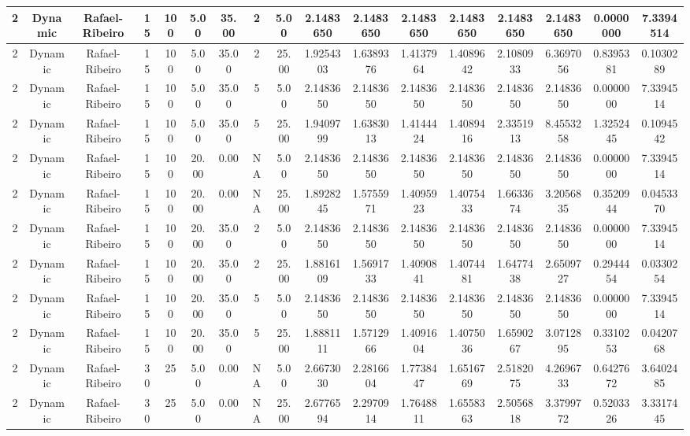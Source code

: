 \documentclass[a4paper]{article}
\begin{document}
\begin{center}
\begin{tabular}{ | c | c | c | c | c | c | c | c | c | c | c | c | c | c | c | c | c | }
		\hline
		2	&	Dynamic	&	Rafael-Ribeiro	&	15	&	100	&	5.00	&	35.00	&	2	&	5.00	&	2.1483650	&	2.1483650	&	2.1483650	&	2.1483650	&	2.1483650	&	2.1483650	&	0.0000000	&	7.3394514 \\
		\hline
		2	&	Dynamic	&	Rafael-Ribeiro	&	15	&	100	&	5.00	&	35.00	&	2	&	25.00	&	1.9254303	&	1.6389376	&	1.4137964	&	1.4089642	&	2.1080933	&	6.3697056	&	0.8395381	&	0.1030289 \\
		\hline
		2	&	Dynamic	&	Rafael-Ribeiro	&	15	&	100	&	5.00	&	35.00	&	5	&	5.00	&	2.1483650	&	2.1483650	&	2.1483650	&	2.1483650	&	2.1483650	&	2.1483650	&	0.0000000	&	7.3394514 \\
		\hline
		2	&	Dynamic	&	Rafael-Ribeiro	&	15	&	100	&	5.00	&	35.00	&	5	&	25.00	&	1.9409799	&	1.6383013	&	1.4144424	&	1.4089416	&	2.3351913	&	8.4553258	&	1.3252445	&	0.1094542 \\
		\hline
		2	&	Dynamic	&	Rafael-Ribeiro	&	15	&	100	&	20.00	&	0.00	&	NA	&	5.00	&	2.1483650	&	2.1483650	&	2.1483650	&	2.1483650	&	2.1483650	&	2.1483650	&	0.0000000	&	7.3394514 \\
		\hline
		2	&	Dynamic	&	Rafael-Ribeiro	&	15	&	100	&	20.00	&	0.00	&	NA	&	25.00	&	1.8928245	&	1.5755971	&	1.4095923	&	1.4075433	&	1.6633674	&	3.2056835	&	0.3520944	&	0.0453370 \\
		\hline
		2	&	Dynamic	&	Rafael-Ribeiro	&	15	&	100	&	20.00	&	35.00	&	2	&	5.00	&	2.1483650	&	2.1483650	&	2.1483650	&	2.1483650	&	2.1483650	&	2.1483650	&	0.0000000	&	7.3394514 \\
		\hline
		2	&	Dynamic	&	Rafael-Ribeiro	&	15	&	100	&	20.00	&	35.00	&	2	&	25.00	&	1.8816109	&	1.5691733	&	1.4090841	&	1.4074481	&	1.6477438	&	2.6509727	&	0.2944454	&	0.0330254 \\
		\hline
		2	&	Dynamic	&	Rafael-Ribeiro	&	15	&	100	&	20.00	&	35.00	&	5	&	5.00	&	2.1483650	&	2.1483650	&	2.1483650	&	2.1483650	&	2.1483650	&	2.1483650	&	0.0000000	&	7.3394514 \\
		\hline
		2	&	Dynamic	&	Rafael-Ribeiro	&	15	&	100	&	20.00	&	35.00	&	5	&	25.00	&	1.8881111	&	1.5712966	&	1.4091604	&	1.4075036	&	1.6590267	&	3.0712895	&	0.3310253	&	0.0420768 \\
		\hline
		2	&	Dynamic	&	Rafael-Ribeiro	&	30	&	25	&	5.00	&	0.00	&	NA	&	5.00	&	2.6673030	&	2.2816604	&	1.7738447	&	1.6516769	&	2.5182075	&	4.2696733	&	0.6427672	&	3.6402485 \\
		\hline
		2	&	Dynamic	&	Rafael-Ribeiro	&	30	&	25	&	5.00	&	0.00	&	NA	&	25.00	&	2.6776594	&	2.2970914	&	1.7648811	&	1.6558363	&	2.5056818	&	3.3799772	&	0.5203326	&	3.3317445 \\

\end{tabular}
\end{center}
\end{document}
